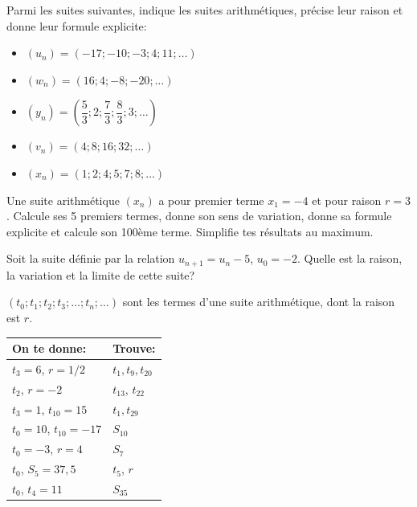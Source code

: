 \documentclass[a4paper,12pt]{report}
\begin{document}
\begin{exercice}
Parmi les suites suivantes, indique les suites arithmétiques, précise leur raison et donne
leur formule explicite:
\par \setlength{\columnseprule}{0 pt}
          \begin{minipage}[t]{\linewidth}
          \begin{multicols}{2}
\begin{itemize}
\item \((u_n)=(-17;-10;-3;4;11;\ldots)\)
\item \((w_n)=(16;4;-8;-20;\ldots)\)
\item \((y_n)=\left(\dfrac{5}{3};2;\dfrac{7}{3};\dfrac{8}{3};3;\ldots
  \right)\)
\item \((v_n)=(4;8;16;32;\ldots)\)
\item \((x_n)=(1;2;4;5;7;8;\ldots)\)
\end{itemize}


\end{multicols}\end{minipage}
\end{exercice}

\begin{exercice}
Une suite arithmétique \((x_n)\) a pour premier terme \(x_1=-4\) et
pour raison \(r=3\). Calcule ses 5 premiers termes, donne son sens de
variation, donne sa formule explicite et calcule son 100ème
terme. Simplifie tes résultats au maximum.
\end{exercice}

\begin{exercice}
Soit la suite définie par la relation \(u_{n+1}=u_n-5\),
\(u_0=-2\). Quelle est la raison, la variation et la limite de cette suite?
\end{exercice}

\begin{exercice}
\((t_0;t_1;t_2;t_3;\ldots;t_n;\ldots)\) sont les termes d'une suite
arithmétique, dont la raison est \(r\).

\begin{center}
\begin{tabular}{|p{6cm}|p{6cm}|}
\hline
On te donne: & Trouve:\\[0pt]
\hline
\(t_3=6\), \(r=1/2\) & \(t_1,t_9,t_{20}\)\\[0pt]
\hline
\(t_2\), \(r=-2\) & \(t_{13}\), \(t_{22}\)\\[0pt]
\hline
\(t_3=1\), \(t_{10}=15\) & \(t_1,t_{29}\)\\[0pt]
\hline
\(t_0=10\), \(t_{10}=-17\) & \(S_{10}\)\\[0pt]
\hline
\(t_0=-3\), \(r=4\) & \(S_7\)\\[0pt]
\hline
\(t_0\), \(S_5=37,5\) & \(t_5\), \(r\)\\[0pt]
\hline
\(t_0\), \(t_4=11\) & \(S_{35}\)\\[0pt]
\hline
\end{tabular}
\end{center}
\end{exercice}
\end{document}
